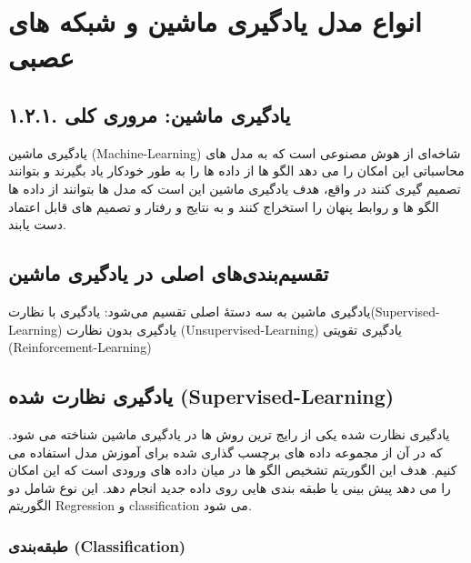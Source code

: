 \section{انواع مدل یادگیری ماشین و شبکه های عصبی}

\subsection{۱.۲.۱. یادگیری ماشین: مروری کلی}

یادگیری ماشین (Machine-Learning) شاخه‌ای از هوش مصنوعی است که به مدل های محاسباتی این امکان را می دهد الگو ها  از داده ها را به طور خودکار یاد بگیرند و بتوانند تصمیم گیری کنند در واقع، هدف یادگیری ماشین این است که مدل ها بتوانند  از داده ها الگو ها و روابط پنهان را استخراج کنند و به نتایج و رفتار و تصمیم های قابل اعتماد دست یابند.
\subsection{تقسیم‌بندی‌های اصلی در یادگیری ماشین}

یادگیری ماشین به سه دستهٔ اصلی تقسیم می‌شود:
یادگیری با نظارت(Supervised-Learning)
یادگیری بدون نظارت (Unsupervised-Learning)
یادگیری تقویتی (Reinforcement-Learning)

\subsection{یادگیری نظارت شده (Supervised-Learning)}
یادگیری نظارت شده یکی از رایج ترین روش ها در یادگیری ماشین شناخته می شود. که در آن از مجموعه داده های برچسب گذاری شده برای آموزش مدل استفاده می کنیم.
هدف این الگوریتم تشخیص الگو ها در میان داده های ورودی است که این امکان را می دهد  پیش بینی یا طبقه بندی هایی روی داده جدید انجام دهد.
این نوع شامل دو الگوریتم Regression  و classification  می شود.

\subsubsection{طبقه‌بندی (Classification)}



